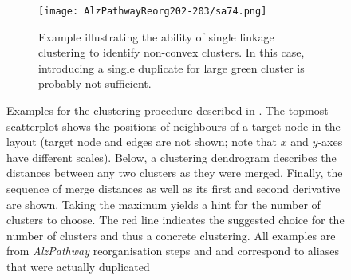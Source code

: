 \documentclass[
	fontsize=10pt, %
	twoside=true, %
	secnumdepth=1, %
  toc=indentunnumbered %
]{kaobook}
\begin{document}
\begin{figure}[h]
      \begin{subfigure}{0.48\linewidth}
        \texttt{[image: AlzPathwayReorg202-203/sa74.png]}
        \caption{
          Example illustrating the ability of single linkage clustering to
          identify non-convex clusters. In this case, introducing a single
          duplicate for large green cluster is probably not sufficient.
        }
        \label{fig:dendro-d}
      \end{subfigure}
      \caption{
    Examples for the clustering procedure described in .
    The topmost scatterplot shows the positions of neighbours
    of a target node in the layout (target node and edges are not shown; note that
    $x$ and $y$-axes have different scales). Below, a clustering dendrogram describes
    the distances between any two clusters as they were merged. Finally, the
    sequence of merge distances as well as its first and second derivative are shown.
    Taking the maximum yields a hint for the number of clusters
    to choose. The red line indicates the suggested choice for the number of
    clusters and thus a concrete clustering.
    All examples are from \textit{AlzPathway} reorganisation steps and
    and correspond to aliases that were actually duplicated}
  \label{fig:neighb-clust-examples}
\end{figure}
\end{document}
